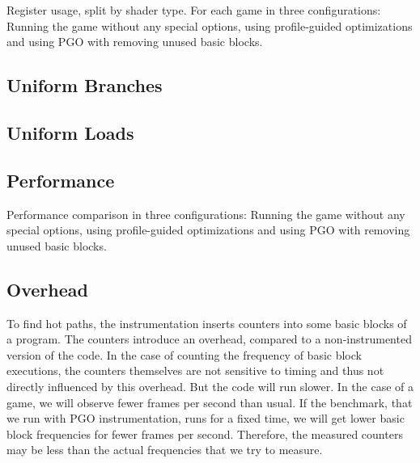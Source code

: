 



Register usage, split by shader type.
For each game in three configurations: Running the game without any special options, using profile-guided optimizations and using PGO with removing unused basic blocks.




\subsection{Uniform Branches}
\label{sub:eval_uniform_branches}



\subsection{Uniform Loads}
\label{sub:eval_uniform_loads}



\subsection{Performance}
\label{sub:eval_perf}
Performance comparison in three configurations: Running the game without any special options, using profile-guided optimizations and using PGO with removing unused basic blocks.



\subsection{Overhead}
\label{sub:overhead}
To find hot paths, the instrumentation inserts counters into some basic blocks of a program. The counters introduce an overhead, compared to a non-instrumented version of the code.
In the case of counting the frequency of basic block executions, the counters themselves are not sensitive to timing and thus not directly influenced by this overhead.
But the code will run slower. In the case of a game, we will observe fewer frames per second than usual.
If the benchmark, that we run with PGO instrumentation, runs for a fixed time, we will get lower basic block frequencies for fewer frames per second.
Therefore, the measured counters may be less than the actual frequencies that we try to measure.

